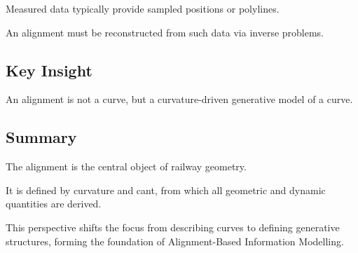 Measured data typically provide sampled positions or polylines.

An alignment must be reconstructed from such data via inverse
problems.

\subsection{Key Insight}

\begin{proposition}
An alignment is not a curve, but a curvature-driven generative model of
a curve.
\end{proposition}

\subsection{Summary}

\begin{summary}
The alignment is the central object of railway geometry.

It is defined by curvature and cant, from which all geometric and
dynamic quantities are derived.

This perspective shifts the focus from describing curves to defining
generative structures, forming the foundation of
Alignment-Based Information Modelling.
\end{summary}
